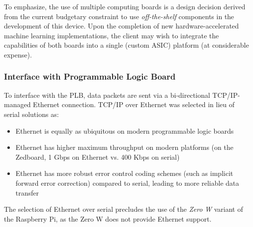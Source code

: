 To emphasize, the use of multiple computing boards is a design decision derived from the current budgetary constraint to use \textit{off-the-shelf} components in the development of this device. Upon the completion of new hardware-accelerated machine learning implementations, the client may wish to integrate the capabilities of both boards into a single (custom ASIC) platform (at considerable expense). 

\subsubsection{Interface with Programmable Logic Board}

To interface with the PLB, data packets are sent via a bi-directional TCP/IP-managed Ethernet connection. TCP/IP over Ethernet was selected in lieu of serial solutions as:
\begin{itemize}
\item Ethernet is equally as ubiquitous on modern programmable logic boards
\item Ethernet has higher maximum throughput on modern platforms (on the Zedboard, 1 Gbps on Ethernet vs. 400 Kbps on serial)
\item Ethernet has more robust error control coding schemes (such as implicit forward error correction\cite{mclaughlin_warland}) compared to serial, leading to more reliable data transfer
\end{itemize} 

The selection of Ethernet over serial precludes the use of the \textit{Zero W} variant of the Raspberry Pi, as the Zero W does not provide Ethernet support. 
